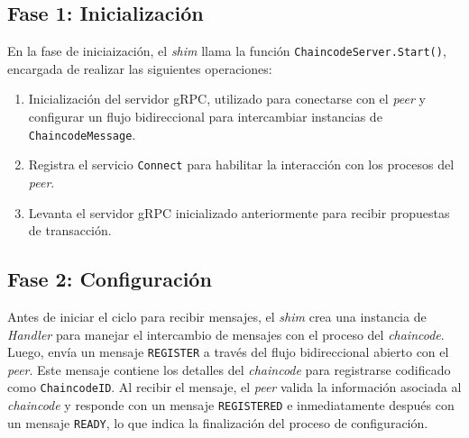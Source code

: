 \subsection{Fase 1: Inicialización}
%
%
%
%

En la fase de iniciaización, el \textit{shim} llama la función  \texttt{ChaincodeServer.Start()}, encargada de realizar las siguientes operaciones:

\begin{enumerate}
\item Inicialización del servidor gRPC, utilizado para conectarse con el \textit{peer} y configurar un flujo bidireccional para intercambiar instancias de \texttt{ChaincodeMessage}.


\item Registra el servicio \texttt{Connect} para habilitar la interacción con los procesos del \textit{peer}.

\item Levanta el servidor gRPC inicializado anteriormente  para recibir propuestas de transacción.
\end{enumerate}

\subsection{Fase 2: Configuración}
Antes de iniciar el ciclo para recibir mensajes, el \textit{shim} crea una instancia de \textit{Handler} para manejar el intercambio de mensajes con el proceso del \textit{chaincode}. Luego, envía un mensaje \texttt{REGISTER} a través del flujo bidireccional abierto con el \textit{peer}. Este mensaje contiene los detalles del \textit{chaincode} para registrarse codificado como \texttt{ChaincodeID}. Al recibir el mensaje, el \textit{peer} valida la información asociada al \textit{chaincode} y responde con un mensaje \texttt{REGISTERED} e inmediatamente después con un mensaje \texttt{READY}, lo que indica la finalización del proceso de configuración.


